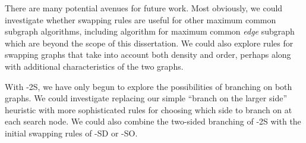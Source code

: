 There are many potential avenues for future work.  Most obviously, we could investigate
whether swapping rules are useful for other maximum common subgraph algorithms, including
algorithm for maximum common \emph{edge} subgraph which are beyond the scope of this
dissertation.
We could also explore rules for swapping graphs that take into account both density and order,
perhaps along with additional characteristics of the two graphs.

With \McSplit-2S, we have only begun to explore the possibilities of branching on both graphs.
We could investigate replacing our simple ``branch on the larger side'' heuristic with more
sophisticated rules for choosing which side to branch on at each search node.  We could also
combine the two-sided branching of \McSplit-2S with the initial swapping rules of \McSplit-SD
or \McSplit-SO.
